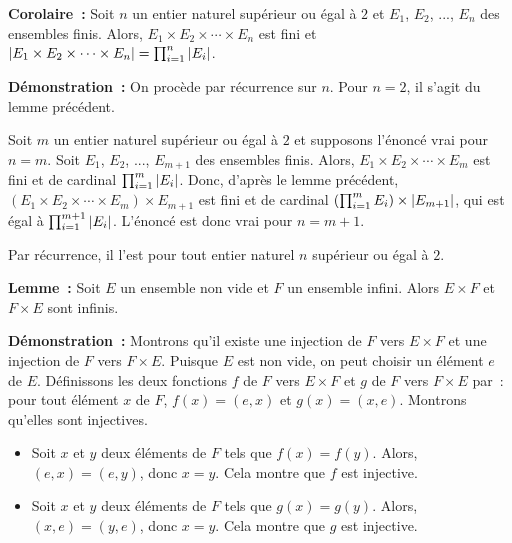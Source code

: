 \done

\medskip

\noindent\textbf{Corolaire :} Soit $n$ un entier naturel supérieur ou égal à $2$ et $E_1$, $E_2$, ..., $E_n$ des ensembles finis.
    Alors, $E_1 \times E_2 \times \cdots \times E_n$ est fini et $\left\lvert E_1 \times E_2 \times \cdots \times E_n \right\rvert = \prod_{i=1}^n \left\lvert E_i \right\rvert$.

\medskip

\noindent\textbf{Démonstration :} On procède par récurrence sur $n$. 
    Pour $n = 2$, il s'agit du lemme précédent.

    Soit $m$ un entier naturel supérieur ou égal à $2$ et supposons l'énoncé vrai pour $n=m$. 
    Soit $E_1$, $E_2$, ..., $E_{m+1}$ des ensembles finis. 
    Alors, $E_1 \times E_2 \times \cdots \times E_m$ est fini et de cardinal $\prod_{i=1}^m \left\lvert E_i \right\rvert$.
    Donc, d'après le lemme précédent, $\left( E_1 \times E_2 \times \cdots \times E_m \right) \times E_{m+1}$ est fini et de cardinal $\left( \prod_{i=1}^m E_i \right) \times \left\lvert E_{m+1} \right\rvert$, qui est égal à $\prod_{i=1}^{m+1} \left\lvert E_i \right\rvert$.
    L'énoncé est donc vrai pour $n = m+1$. 

    Par récurrence, il l'est pour tout entier naturel $n$ supérieur ou égal à $2$.

    \done

\medskip

\noindent\textbf{Lemme :} Soit $E$ un ensemble non vide et $F$ un ensemble infini.
    Alors $E \times F$ et $F \times E$ sont infinis.

\medskip

\noindent\textbf{Démonstration :} Montrons qu'il existe une injection de $F$ vers $E \times F$ et une injection de $F$ vers $F \times E$.
    Puisque $E$ est non vide, on peut choisir un élément $e$ de $E$. 
    Définissons les deux fonctions $f$ de $F$ vers $E \times F$ et $g$ de $F$ vers $F \times E$ par : pour tout élément $x$ de $F$, $f(x) = (e,x)$ et $g(x) = (x,e)$. 
    Montrons qu'elles sont injectives. 
    \begin{itemize}[nosep]
        \item Soit $x$ et $y$ deux éléments de $F$ tels que $f(x) = f(y)$.
            Alors, $(e,x) = (e,y)$, donc $x = y$.
            Cela montre que $f$ est injective.
        \item Soit $x$ et $y$ deux éléments de $F$ tels que $g(x) = g(y)$.
            Alors, $(x,e) = (y,e)$, donc $x = y$.
            Cela montre que $g$ est injective.
    \end{itemize}

